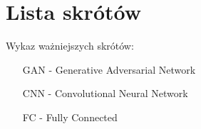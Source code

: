 \section*{Lista skrótów} %

  \bigskip
  Wykaz ważniejszych skrótów:

    \begin{itemize}
      \item[GAN] - Generative Adversarial Network
      \item[CNN] - Convolutional Neural Network
      \item[FC] - Fully Connected
    \end{itemize}
